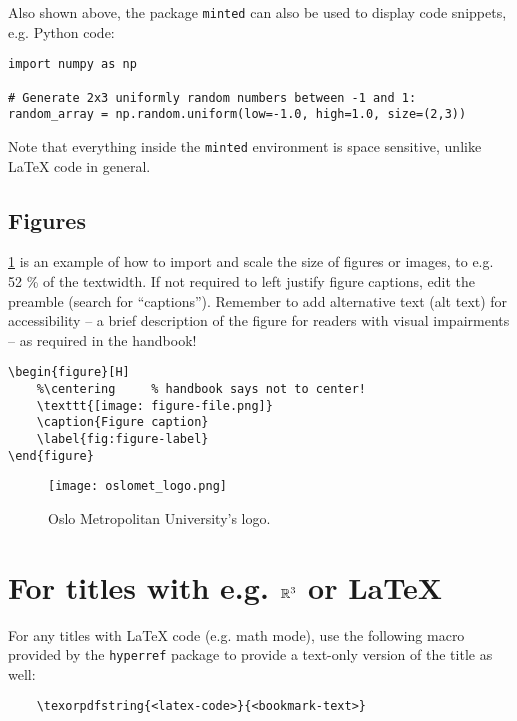 Also shown above, the package \texttt{minted} can also be used to display code snippets, e.g. Python code:
\begin{verbatim}
import numpy as np

# Generate 2x3 uniformly random numbers between -1 and 1:
random_array = np.random.uniform(low=-1.0, high=1.0, size=(2,3))
\end{verbatim}
Note         that everything inside the \texttt{minted} environment is space sensitive, unlike       \LaTeX{} code in         general.

\subsection{Figures}
\cref{fig:logo} is an example of how to import and scale the size of figures or images, to e.g. 52 \% of the textwidth. If not required to left justify figure captions, edit the preamble (search for \enquote{captions}). Remember to add alternative text (alt text) for accessibility – a brief description of the figure for readers with visual impairments – as required in the handbook!

\begin{verbatim}
\begin{figure}[H]
    %\centering     % handbook says not to center!
    \texttt{[image: figure-file.png]}
    \caption{Figure caption}
    \label{fig:figure-label}
\end{figure}   
\end{verbatim}

\begin{figure}[H]
    \texttt{[image: oslomet\_logo.png]}
    \caption{Oslo Metropolitan University's logo.}
    \label{fig:logo}
\end{figure}



\section{For titles with \texorpdfstring{e.g. \(\mathbb{R}^3\)  or \LaTeX{}}{LaTeX code}}

For any titles with \LaTeX{} code (e.g. math mode), use the following macro provided by the \texttt{hyperref} package to provide a text-only version of the title as well: \\
\begin{verbatim}
    \texorpdfstring{<latex-code>}{<bookmark-text>}
\end{verbatim}


